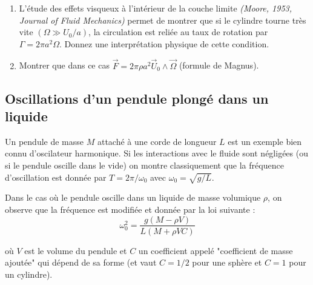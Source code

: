 \begin{enumerate}
\item L'étude des effets visqueux à l'intérieur de la couche limite {\em (Moore, 1953, Journal of Fluid Mechanics)} permet de montrer que si le cylindre tourne très vite $(\Omega \gg U_0/a)$,  
la circulation est reliée au taux de rotation par $\Gamma = 2 \pi a^2 \Omega$.
Donnez une interprétation physique de cette condition.

\item Montrer que dans ce cas 
$\overrightarrow{F} = 2 \pi \rho a^2 \overrightarrow{U}_0 \wedge \overrightarrow{\Omega}$
(formule de Magnus).

\end{enumerate}







\subsection{Oscillations d'un pendule plongé dans un liquide}

Un pendule de masse $M$ attaché à une corde de longueur $L$ est un exemple bien connu d'oscilateur harmonique. Si les interactions avec le fluide sont négligées (ou si le pendule oscille dans le vide) on montre classiquement que la fréquence d'oscillation est donnée par 
$T = 2\pi/\omega_0$ avec $\omega_0 = \sqrt{g/L}$.

Dans le cas où le pendule oscille dans un liquide de masse volumique $\rho$, on observe que la fréquence est modifiée et donnée par la loi suivante :
\begin{equation}
\omega_0^2 = \frac{g (M - \rho V)}{L (M+\rho V C)}
\label{eq:omega0}
\end{equation}

où $V$ est le volume du pendule et $C$ un coefficient appelé "coefficient de masse ajoutée" 
qui dépend de sa forme (et vaut $C=1/2$ pour une sphère et $C=1$ pour un cylindre).




